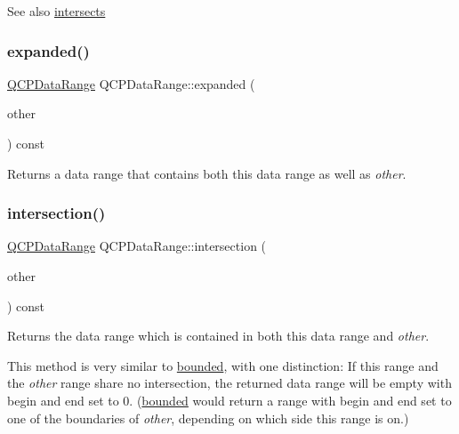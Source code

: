 \begin{DoxySeeAlso}{See also}
\hyperlink{classQCPDataRange_a8a1c437f9beffd55621f48f961d7f679}{intersects} 
\end{DoxySeeAlso}
\mbox{\label{classQCPDataRange_a36c8ad8acf177ffeb0a72c8d73030844}} 
\subsubsection{\texorpdfstring{expanded()}{expanded()}}
{\footnotesize\ttfamily \hyperlink{classQCPDataRange}{Q\+C\+P\+Data\+Range} Q\+C\+P\+Data\+Range\+::expanded (\begin{DoxyParamCaption}\item[{const \hyperlink{classQCPDataRange}{Q\+C\+P\+Data\+Range} \&}]{other }\end{DoxyParamCaption}) const}

Returns a data range that contains both this data range as well as {\itshape other}. \mbox{\label{classQCPDataRange_a84e1e03129dd52528efb4bac18d30183}} 
\subsubsection{\texorpdfstring{intersection()}{intersection()}}
{\footnotesize\ttfamily \hyperlink{classQCPDataRange}{Q\+C\+P\+Data\+Range} Q\+C\+P\+Data\+Range\+::intersection (\begin{DoxyParamCaption}\item[{const \hyperlink{classQCPDataRange}{Q\+C\+P\+Data\+Range} \&}]{other }\end{DoxyParamCaption}) const}

Returns the data range which is contained in both this data range and {\itshape other}.

This method is very similar to \hyperlink{classQCPDataRange_a93529421d12fdd3a8bdb2b8061936352}{bounded}, with one distinction\+: If this range and the {\itshape other} range share no intersection, the returned data range will be empty with begin and end set to 0. (\hyperlink{classQCPDataRange_a93529421d12fdd3a8bdb2b8061936352}{bounded} would return a range with begin and end set to one of the boundaries of {\itshape other}, depending on which side this range is on.)

